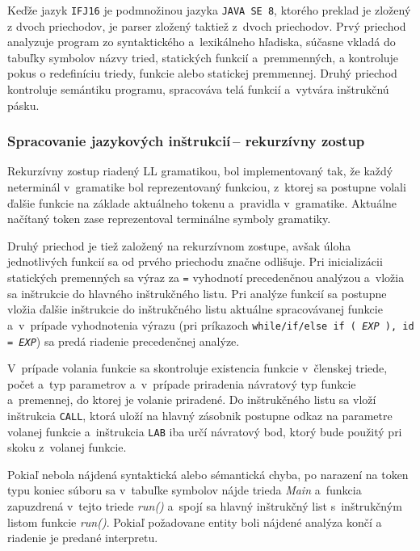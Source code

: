 \documentclass[11pt,a4paper]{article}
\begin{document}
    Keďže jazyk \texttt{IFJ16} je podmnožinou jazyka \texttt{JAVA SE 8}, ktorého preklad je zložený z dvoch priechodov, je parser zložený taktiež z~dvoch priechodov. Prvý priechod analyzuje program zo syntaktického a~lexikálneho hľadiska, súčasne vkladá do tabuľky symbolov názvy tried, statických funkcií a~premmenných, a kontroluje pokus o redefiníciu triedy, funkcie alebo statickej premmennej.
    Druhý priechod kontroluje semántiku programu, spracováva telá funkcií a~vytvára inštrukčnú pásku.



        \subsubsection{Spracovanie jazykových inštrukcií\,-- rekurzívny zostup}
        \label{rekurzia}
        Rekurzívny zostup riadený LL gramatikou, bol implementovaný tak, že každý neterminál v~gramatike bol reprezentovaný funkciou, z~ktorej sa postupne volali ďalšie funkcie na základe aktuálneho tokenu a~pravidla v~gramatike. Aktuálne načítaný token zase reprezentoval terminálne symboly gramatiky.

        Druhý priechod je tiež založený na rekurzívnom zostupe, avšak úloha jednotlivých funkcií sa od prvého priechodu značne odlišuje.
        Pri inicializácii statických premenných sa výraz za \texttt{=} vyhodnotí precedenčnou analýzou a~vložia sa inštrukcie do hlavného inštrukčného listu. Pri analýze funkcií sa postupne vložia ďalšie inštrukcie do inštrukčného listu aktuálne spracovávanej funkcie a~v~prípade vyhodnotenia výrazu (pri príkazoch \texttt{while/if/else if ( \emph{EXP} ), id = \emph{EXP}}) sa predá riadenie precedenčnej analýze.

        V~prípade volania funkcie sa skontroluje existencia funkcie v~členskej triede, počet a~typ parametrov a~v~prípade priradenia
        návratový typ funkcie a~premennej, do ktorej je volanie priradené.
        Do inštrukčného listu sa vloží inštrukcia \texttt{CALL}, ktorá uloží na hlavný zásobnik postupne odkaz na parametre
        volanej funkcie a~inštrukcia \texttt{LAB} iba určí návratový bod, ktorý bude použitý pri skoku z~volanej funkcie.

        Pokiaľ nebola nájdená syntaktická alebo sémantická chyba, po narazení na token typu koniec súboru sa v~tabuľke symbolov nájde
        trieda \emph{Main} a~funkcia zapuzdrená v~tejto triede \emph{run()} a~spojí sa hlavný inštrukčný list s~inštrukčným listom funkcie
        \emph{run()}. Pokiaľ požadovane entity boli nájdené analýza končí a riadenie je predané interpretu.
\end{document}
